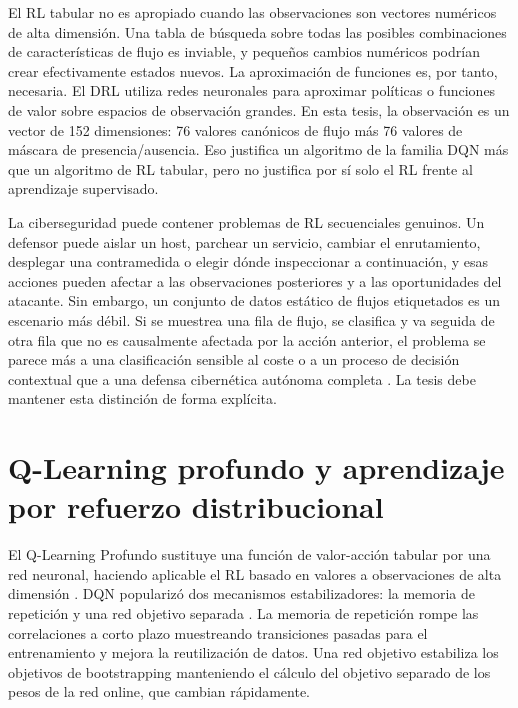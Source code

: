 El RL tabular no es apropiado cuando las observaciones son vectores numéricos de alta dimensión. Una tabla de búsqueda sobre todas las posibles combinaciones de características de flujo es inviable, y pequeños cambios numéricos podrían crear efectivamente estados nuevos. La aproximación de funciones es, por tanto, necesaria. El DRL utiliza redes neuronales para aproximar políticas o funciones de valor sobre espacios de observación grandes. En esta tesis, la observación es un vector de 152 dimensiones: 76 valores canónicos de flujo más 76 valores de máscara de presencia/ausencia. Eso justifica un algoritmo de la familia DQN más que un algoritmo de RL tabular, pero no justifica por sí solo el RL frente al aprendizaje supervisado.

La ciberseguridad puede contener problemas de RL secuenciales genuinos. Un defensor puede aislar un host, parchear un servicio, cambiar el enrutamiento, desplegar una contramedida o elegir dónde inspeccionar a continuación, y esas acciones pueden afectar a las observaciones posteriores y a las oportunidades del atacante. Sin embargo, un conjunto de datos estático de flujos etiquetados es un escenario más débil. Si se muestrea una fila de flujo, se clasifica y va seguida de otra fila que no es causalmente afectada por la acción anterior, el problema se parece más a una clasificación sensible al coste o a un proceso de decisión contextual que a una defensa cibernética autónoma completa \parencite{Levine2020OfflineRL,Fujimoto2019BCQ}. La tesis debe mantener esta distinción de forma explícita.

\section{Q-Learning profundo y aprendizaje por refuerzo distribucional}

El Q-Learning Profundo sustituye una función de valor-acción tabular por una red neuronal, haciendo aplicable el RL basado en valores a observaciones de alta dimensión \parencite{Mnih2015DQN}. DQN popularizó dos mecanismos estabilizadores: la memoria de repetición y una red objetivo separada \parencite{Mnih2015DQN}. La memoria de repetición rompe las correlaciones a corto plazo muestreando transiciones pasadas para el entrenamiento y mejora la reutilización de datos. Una red objetivo estabiliza los objetivos de bootstrapping manteniendo el cálculo del objetivo separado de los pesos de la red online, que cambian rápidamente.

